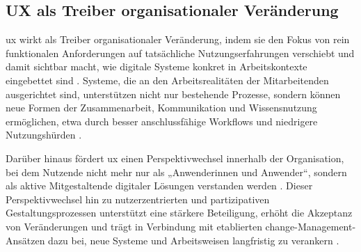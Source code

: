 \subsection{UX als Treiber organisationaler Veränderung}
\label{subsec:02-04-01_ux-as-change-driver}

\Gls{ux} wirkt als Treiber organisationaler Veränderung, indem sie den Fokus von rein funktionalen Anforderungen auf tatsächliche Nutzungserfahrungen verschiebt und damit sichtbar macht, wie digitale Systeme konkret in Arbeitskontexte eingebettet sind \cite{417:Benyon2019,408:Hassenzahl2010}. Systeme, die an den Arbeitsrealitäten der Mitarbeitenden ausgerichtet sind, unterstützen nicht nur bestehende Prozesse, sondern können neue Formen der Zusammenarbeit, Kommunikation und Wissensnutzung ermöglichen, etwa durch besser anschlussfähige Workflows und niedrigere Nutzungshürden \cite{417:Benyon2019,403:Westerman2014}.

Darüber hinaus fördert \Gls{ux} einen Perspektivwechsel innerhalb der Organisation, bei dem Nutzende nicht mehr nur als „Anwenderinnen und Anwender“, sondern als aktive Mitgestaltende digitaler Lösungen verstanden werden \cite{109:Liedtka2018,417:Benyon2019}. Dieser Perspektivwechsel hin zu nutzerzentrierten und partizipativen Gestaltungsprozessen unterstützt eine stärkere Beteiligung, erhöht die Akzeptanz von Veränderungen und trägt in Verbindung mit etablierten \Gls{change}-Management-Ansätzen dazu bei, neue Systeme und Arbeitsweisen langfristig zu verankern \cite{418:Kotter2012,110:Lewin1947}.